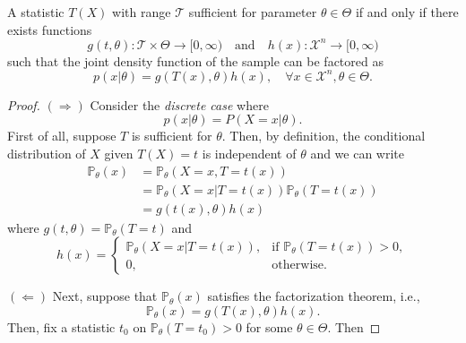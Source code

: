 \begin{theorem}
    A statistic $T(X)$ with range $\mathcal{T}$ sufficient for parameter $\theta \in \Theta$ if and only if 
    there exists functions 
    \begin{equation}
        g(t, \theta) : \mathcal{T} \times \Theta \to [0, \infty) \quad \text{and} \quad h(x) : \mathcal{X}^n \to [0, \infty)
    \end{equation}
    such that the joint density function of the sample can be factored as
    \begin{equation}
        p(x | \theta) = g(T(x), \theta) h(x), \quad \forall x \in \mathcal{X}^n, \theta \in \Theta.
    \end{equation}
\end{theorem}
\begin{proof}
    $(\Rightarrow)$ Consider the \textit{discrete case} where 
    \[
        p(x|\theta) = P(X = x | \theta).
    \]
    First of all, suppose $T$ is sufficient for $\theta$. Then, by definition, the conditional distribution of $X$ given $T(X) = t$ is independent of $\theta$ and 
    we can write
    \begin{align*}
        \mathbb{P}_\theta(x) &= \mathbb{P}_\theta(X = x, T = t(x))\\
        &= \mathbb{P}_\theta(X = x | T = t(x)) \mathbb{P}_\theta(T = t(x))\\
        &= g(t(x), \theta) h(x)
    \end{align*}
    where $g(t, \theta) = \mathbb{P}_\theta(T = t)$ and 
    \[
        h(x) = \begin{cases}
            \mathbb{P}_\theta(X = x | T = t(x)), & \text{if } \mathbb{P}_\theta(T = t(x)) > 0,\\
            0, & \text{otherwise}.
        \end{cases}
    \]

    $(\Leftarrow)$ Next, suppose that $\mathbb{P}_\theta(x)$ satisfies the factorization theorem, i.e.,
    \[
        \mathbb{P}_\theta(x) = g(T(x), \theta) h(x).
    \]
    Then, fix a statistic $t_0$ on $\mathbb{P}_\theta (T = t_0) > 0$ for some $\theta \in \Theta$. Then 
\end{proof}

